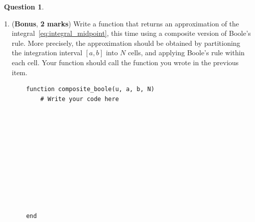 \documentclass[10pt]{article}
\theoremstyle{definition}
\newtheorem{question}{{\normalfont \faGears}~Question}
\renewcommand{\mymarks}[1]{\textbf{#1 marks}}
\begin{document}
\begin{question}
\begin{enumerate}
\begin{verbatim}
    end
            \end{verbatim}
        \item
            (\textbf{Bonus}, \mymarks{2})
            Write a function 
            that returns an approximation of the integral~\eqref{eq:integral_midpoint},
            this time using a composite version of Boole's rule.
            More precisely, the approximation should be obtained
            by partitioning the integration interval $[a, b]$ into $N$ cells,
            and applying Boole's rule within each cell.
            Your function should call the function  you wrote in the previous item.

            \begin{verbatim}
    function composite_boole(u, a, b, N)
        # Write your code here











    end
            \end{verbatim}
    \end{enumerate}
\end{question}
\end{document}
